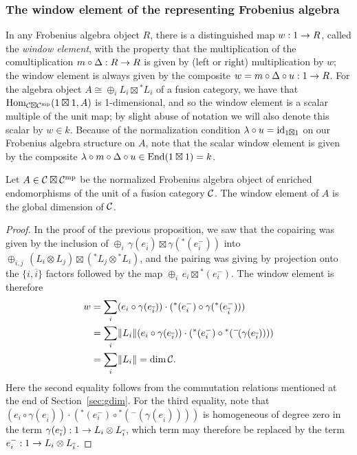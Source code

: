 \documentclass{amsart}
\begin{document}
\subsubsection{The window element of the representing Frobenius algebra}

In any Frobenius algebra object $R$, there is a distinguished map $w: 1 \rightarrow R$, called the \emph{window element}, with the property that the multiplication of the comultiplication $m \circ \Delta: R \rightarrow R$ is given by (left or right) multiplication by $w$; the window element is always given by the composite $w = m \circ \Delta \circ u: 1 \rightarrow R$.  For the algebra object $A \cong \oplus_i L_i \boxtimes {}^* L_i$ of a fusion category, we have that $\operatorname{Hom}_{\mathcal C \boxtimes \mathcal C^{\mathrm{mp}}}(1 \boxtimes 1, A)$ is 1-dimensional, and so the window element is a scalar multiple of the unit map; by slight abuse of notation we will also denote this scalar by $w \in k$.  Because of the normalization condition $\lambda \circ u = \mathrm{id}_{1 \boxtimes 1}$ on our Frobenius algebra structure on $A$, note that the scalar window element is given by the composite $\lambda \circ m \circ \Delta \circ u \in \operatorname{End}(1 \boxtimes 1) = k$.
\begin{proposition}
Let $A \in \mathcal C \boxtimes \mathcal C^{\mathrm{mp}}$ be the normalized Frobenius algebra object of enriched endomorphisms of the unit of a fusion category $\mathcal C$.  The window element of $A$ is the global dimension of $\mathcal C$.
\end{proposition}
\begin{proof}
In the proof of the previous proposition, we saw that the copairing was given by the inclusion of $\oplus_i \, \gamma(e_{\overline{i}}) \boxtimes \gamma({}^*(e_{\overline{i}}^{-}))$ into $\oplus_{i,j} \, (L_i \otimes L_j) \boxtimes ({}^* L_j \otimes {}^* L_i)$, and the pairing was giving by projection onto the $\{i,\overline{i}\}$ factors followed by the map $\oplus_i \, e_i \boxtimes {}^*(e_i^{-})$.  The window element is therefore
\begin{align*}
w &= \sum_i (e_i \circ \gamma(e_{\overline{i}})) \cdot ({}^*(e_i^{-}) \circ \gamma({}^*(e_{\overline{i}}^{-}))) \\
&= \sum_i \lVert L_i \rVert (e_i \circ \gamma(e_{\overline{i}})) \cdot ({}^*(e_i^{-}) \circ {}^* ({}^-\!(\gamma(e_{\overline{i}})))) \\
&= \sum_i \lVert L_i \rVert = \dim \mathcal C.
\end{align*}
Here the second equality follows from the commutation relations mentioned at the end of Section~\ref{sec:gdim}.  For the third equality, note that $(e_i \circ \gamma(e_{\overline{i}})) \cdot ({}^*(e_i^{-}) \circ {}^* ({}^-\!(\gamma(e_{\overline{i}}))))$ is homogeneous of degree zero in the term $\gamma(e_{\overline{i}}): 1 \rightarrow L_i \otimes L_{\overline{i}}$, which term may therefore be replaced by the term $e_i^{-}: 1 \rightarrow L_i \otimes L_{\overline{i}}$.
\end{proof}
\end{document}
